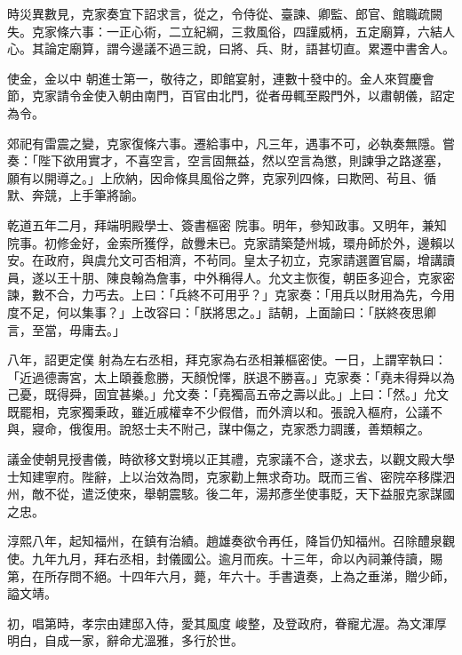 \begin{pinyinscope}
 時災異數見，克家奏宜下詔求言，從之，令侍從、臺諫、卿監、郎官、館職疏闕失。克家條六事：一正心術，二立紀綱，三救風俗，四謹威柄，五定廟算，六結人心。其論定廟算，謂今邊議不過三說，曰將、兵、財，語甚切直。累遷中書舍人。



 使金，金以中
 朝進士第一，敬待之，即館宴射，連數十發中的。金人來賀慶會節，克家請令金使入朝由南門，百官由北門，從者毋輒至殿門外，以肅朝儀，詔定為令。



 郊祀有雷震之變，克家復條六事。遷給事中，凡三年，遇事不可，必執奏無隱。嘗奏：「陛下欲用實才，不喜空言，空言固無益，然以空言為懲，則諫爭之路遂塞，願有以開導之。」上欣納，因命條具風俗之弊，克家列四條，曰欺罔、茍且、循默、奔競，上手筆將諭。



 乾道五年二月，拜端明殿學士、簽書樞密
 院事。明年，參知政事。又明年，兼知院事。初修金好，金索所獲俘，啟釁未已。克家請築楚州城，環舟師於外，邊賴以安。在政府，與虞允文可否相濟，不茍同。皇太子初立，克家請選置官屬，增講讀員，遂以王十朋、陳良翰為詹事，中外稱得人。允文主恢復，朝臣多迎合，克家密諫，數不合，力丐去。上曰：「兵終不可用乎？」克家奏：「用兵以財用為先，今用度不足，何以集事？」上改容曰：「朕將思之。」詰朝，上面諭曰：「朕終夜思卿言，至當，毋庸去。」



 八年，詔更定僕
 射為左右丞相，拜克家為右丞相兼樞密使。一日，上謂宰執曰：「近過德壽宮，太上頤養愈勝，天顏悅懌，朕退不勝喜。」克家奏：「堯未得舜以為己憂，既得舜，固宜甚樂。」允文奏：「堯獨高五帝之壽以此。」上曰：「然。」允文既罷相，克家獨秉政，雖近戚權幸不少假借，而外濟以和。張說入樞府，公議不與，寢命，俄復用。說怒士夫不附己，謀中傷之，克家悉力調護，善類賴之。



 議金使朝見授書儀，時欲移文對境以正其禮，克家議不合，遂求去，以觀文殿大學
 士知建寧府。陛辭，上以治效為問，克家勸上無求奇功。既而三省、密院卒移牒泗州，敵不從，遣泛使來，舉朝震駭。後二年，湯邦彥坐使事貶，天下益服克家謀國之忠。



 淳熙八年，起知福州，在鎮有治績。趙雄奏欲令再任，降旨仍知福州。召除醴泉觀使。九年九月，拜右丞相，封儀國公。逾月而疾。十三年，命以內祠兼侍讀，賜第，在所存問不絕。十四年六月，薨，年六十。手書遺奏，上為之垂涕，贈少師，謚文靖。



 初，唱第時，孝宗由建邸入侍，愛其風度
 峻整，及登政府，眷寵尤渥。為文渾厚明白，自成一家，辭命尤溫雅，多行於世。




\end{pinyinscope}
